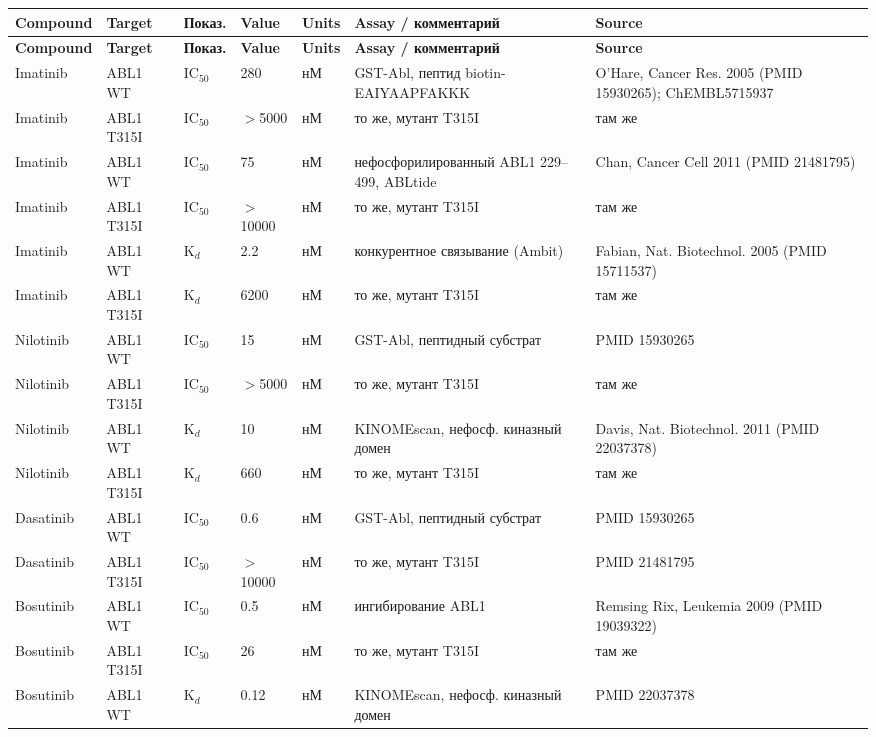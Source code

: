 \documentclass[12pt,a4paper]{article}
\begin{document}
\begin{center}
\scriptsize
\begin{longtable}{L{1.7cm}L{1.5cm}L{1.0cm}L{1.3cm}L{0.7cm}L{3.2cm}L{4.0cm}}
\toprule
\textbf{Compound} & \textbf{Target} & \textbf{Показ.} & \textbf{Value} & \textbf{Units} & \textbf{Assay / комментарий} & \textbf{Source} \\
\midrule
\endfirsthead
\toprule
\textbf{Compound} & \textbf{Target} & \textbf{Показ.} & \textbf{Value} & \textbf{Units} & \textbf{Assay / комментарий} & \textbf{Source} \\
\midrule
\endhead
Imatinib & ABL1 WT & IC$_{50}$ & 280 & нМ & GST-Abl, пептид biotin-EAIYAAPFAKKK & O'Hare, Cancer Res. 2005 (PMID 15930265); ChEMBL5715937 \\
Imatinib & ABL1 T315I & IC$_{50}$ & $>$5000 & нМ & то же, мутант T315I & там же \\
Imatinib & ABL1 WT & IC$_{50}$ & 75 & нМ & нефосфорилированный ABL1 229--499, ABLtide & Chan, Cancer Cell 2011 (PMID 21481795) \\
Imatinib & ABL1 T315I & IC$_{50}$ & $>$10000 & нМ & то же, мутант T315I & там же \\
Imatinib & ABL1 WT & K$_d$ & 2.2 & нМ & конкурентное связывание (Ambit) & Fabian, Nat. Biotechnol. 2005 (PMID 15711537) \\
Imatinib & ABL1 T315I & K$_d$ & 6200 & нМ & то же, мутант T315I & там же \\
Nilotinib & ABL1 WT & IC$_{50}$ & 15 & нМ & GST-Abl, пептидный субстрат & PMID 15930265 \\
Nilotinib & ABL1 T315I & IC$_{50}$ & $>$5000 & нМ & то же, мутант T315I & там же \\
Nilotinib & ABL1 WT & K$_d$ & 10 & нМ & KINOMEscan, нефосф. киназный домен & Davis, Nat. Biotechnol. 2011 (PMID 22037378) \\
Nilotinib & ABL1 T315I & K$_d$ & 660 & нМ & то же, мутант T315I & там же \\
Dasatinib & ABL1 WT & IC$_{50}$ & 0.6 & нМ & GST-Abl, пептидный субстрат & PMID 15930265 \\
Dasatinib & ABL1 T315I & IC$_{50}$ & $>$10000 & нМ & то же, мутант T315I & PMID 21481795 \\
Bosutinib & ABL1 WT & IC$_{50}$ & 0.5 & нМ & ингибирование ABL1 & Remsing Rix, Leukemia 2009 (PMID 19039322) \\
Bosutinib & ABL1 T315I & IC$_{50}$ & 26 & нМ & то же, мутант T315I & там же \\
Bosutinib & ABL1 WT & K$_d$ & 0.12 & нМ & KINOMEscan, нефосф. киназный домен & PMID 22037378 \\

\end{longtable}
\end{center}
\end{document}
